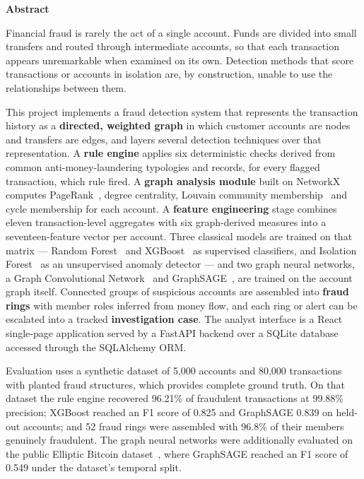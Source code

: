 \begin{center}
\vspace*{-0.55cm}
{\large\bfseries Abstract\par}
\end{center}
\vspace{10pt}

Financial fraud is rarely the act of a single account. Funds are divided into small transfers and routed through intermediate accounts, so that each transaction appears unremarkable when examined on its own. Detection methods that score transactions or accounts in isolation are, by construction, unable to use the relationships between them.

This project implements a fraud detection system that represents the transaction history as a \textbf{directed, weighted graph} in which customer accounts are nodes and transfers are edges, and layers several detection techniques over that representation. A \textbf{rule engine} applies six deterministic checks derived from common anti-money-laundering typologies and records, for every flagged transaction, which rule fired. A \textbf{graph analysis module} built on NetworkX computes PageRank~\cite{page1999}, degree centrality, Louvain community membership~\cite{blondel2008} and cycle membership for each account. A \textbf{feature engineering} stage combines eleven transaction-level aggregates with six graph-derived measures into a seventeen-feature vector per account. Three classical models are trained on that matrix --- Random Forest~\cite{breiman2001} and XGBoost~\cite{chen2016} as supervised classifiers, and Isolation Forest~\cite{liu2008} as an unsupervised anomaly detector --- and two graph neural networks, a Graph Convolutional Network~\cite{kipf2017} and GraphSAGE~\cite{hamilton2017}, are trained on the account graph itself. Connected groups of suspicious accounts are assembled into \textbf{fraud rings} with member roles inferred from money flow, and each ring or alert can be escalated into a tracked \textbf{investigation case}. The analyst interface is a React single-page application served by a FastAPI backend over a SQLite database accessed through the SQLAlchemy ORM.

Evaluation uses a synthetic dataset of 5,000 accounts and 80,000 transactions with planted fraud structures, which provides complete ground truth. On that dataset the rule engine recovered 96.21\% of fraudulent transactions at 99.88\% precision; XGBoost reached an F1 score of 0.825 and GraphSAGE 0.839 on held-out accounts; and 52 fraud rings were assembled with 96.8\% of their members genuinely fraudulent. The graph neural networks were additionally evaluated on the public Elliptic Bitcoin dataset~\cite{weber2019}, where GraphSAGE reached an F1 score of 0.549 under the dataset's temporal split.

